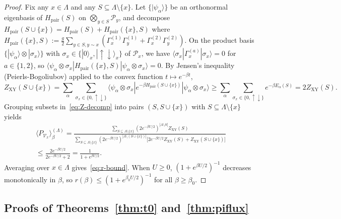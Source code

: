 \documentclass[11pt]{article}
\theoremstyle{definition}
\theoremstyle{remark}
\newcommand{\calP}{\mathcal{P}}
\newcommand{\calV}{\mathcal{V}}
\begin{document}
\begin{proof}
Fix any $x \in \Lambda$ and any $S \subseteq \Lambda \setminus \{x\}$. Let $\{|\psi_\alpha\rangle\}$ be an orthonormal eigenbasis of $H_{\mathrm{pair}}(S)$ on $\bigotimes_{y \in S}\calP_y$, and decompose $H_{\mathrm{pair}}(S \cup \{x\}) = H_{\mathrm{pair}}(S) + H_{\mathrm{pair}}(\{x\}, S)$ where $H_{\mathrm{pair}}(\{x\}, S) := \frac{g}{2}\sum_{y \in S, y \sim x}(\Gamma_x^{(1)}\Gamma_y^{(1)} + \Gamma_x^{(2)}\Gamma_y^{(2)})$. On the product basis $\{|\psi_\alpha\rangle \otimes |\sigma_x\rangle\}$ with $\sigma_x \in \{|0\rangle_x, |\uparrow\downarrow\rangle_x\}$ of $\calP_x$, we have $\langle \sigma_x | \Gamma_x^{(a)} | \sigma_x \rangle = 0$ for $a \in \{1, 2\}$, so $\langle \psi_\alpha \otimes \sigma_x | H_{\mathrm{pair}}(\{x\}, S) | \psi_\alpha \otimes \sigma_x \rangle = 0$. By Jensen's inequality (Peierls-Bogoliubov) applied to the convex function $t \mapsto e^{-\beta t}$,
\begin{equation}\label{eq:ZXY-jensen}
Z_{\mathrm{XY}}(S \cup \{x\}) = \sum_{\alpha} \sum_{\sigma_x \in \{0, \uparrow\downarrow\}} \langle \psi_\alpha \otimes \sigma_x | e^{-\beta H_{\mathrm{pair}}(S \cup \{x\})} | \psi_\alpha \otimes \sigma_x \rangle \ge \sum_{\alpha} \sum_{\sigma_x \in \{0, \uparrow\downarrow\}} e^{-\beta E_\alpha(S)} = 2 Z_{\mathrm{XY}}(S).
\end{equation}
Grouping subsets in~\eqref{eq:Z-decomp} into pairs $(S, S \cup \{x\})$ with $S \subseteq \Lambda \setminus \{x\}$ yields
\begin{multline*}
\langle P_{\calV_x} \rangle_\beta^{(\Lambda)} = \frac{\sum_{S \subseteq \Lambda \setminus \{x\}} (2 e^{-\beta U/2})^{|\Lambda \setminus S|} Z_{\mathrm{XY}}(S)}{\sum_{S \subseteq \Lambda \setminus \{x\}} (2 e^{-\beta U/2})^{|\Lambda \setminus (S \cup \{x\})|} \bigl[2 e^{-\beta U/2} Z_{\mathrm{XY}}(S) + Z_{\mathrm{XY}}(S \cup \{x\})\bigr]} \\
\le \frac{2 e^{-\beta U/2}}{2 e^{-\beta U/2} + 2} = \frac{1}{1 + e^{\beta U/2}}.
\end{multline*}
Averaging over $x \in \Lambda$ gives~\eqref{eq:r-bound}. When $U \ge 0$, $(1 + e^{\beta U/2})^{-1}$ decreases monotonically in $\beta$, so $r(\beta) \le (1 + e^{\beta_0 U/2})^{-1}$ for all $\beta \ge \beta_0$.
\end{proof}

\subsection{Proofs of Theorems~\ref{thm:t0} and~\ref{thm:piflux}}\label{subsec:proof-main}
\end{document}
